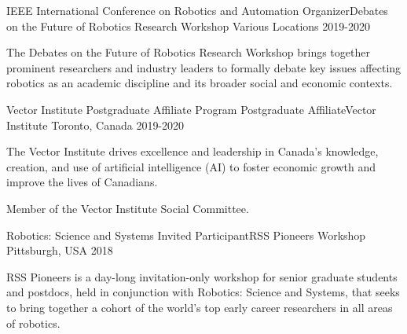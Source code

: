 

\begin{cventries} 

  \cventry
    {IEEE International Conference on Robotics and Automation} %
    {Organizer{\enskip\cdotp\enskip}Debates on the Future of Robotics Research Workshop} %
    {Various Locations} %
    {2019-2020} %
    {
      \begin{cvitems} %
        \item {The Debates on the Future of Robotics Research Workshop brings together prominent researchers and industry leaders to formally debate key issues affecting robotics as an academic discipline and its broader social and economic contexts.}
      \end{cvitems}
    }
    
  \cventry
    {Vector Institute Postgraduate Affiliate Program} %
    {Postgraduate Affiliate{\enskip\cdotp\enskip}Vector Institute} %
    {Toronto, Canada} %
    {2019-2020} %
    {
      \begin{cvitems} %
        \item {The Vector Institute drives excellence and leadership in Canada’s knowledge, creation, and use of artificial intelligence (AI) to foster economic growth and improve the lives of Canadians.}
        \item Member of the Vector Institute Social Committee.
      \end{cvitems}
    }
    
  \cventry
    {Robotics: Science and Systems} %
    {Invited Participant{\enskip\cdotp\enskip}RSS Pioneers Workshop} %
    {Pittsburgh, USA} %
    {2018} %
    {
      \begin{cvitems} %
        \item {RSS Pioneers is a day-long invitation-only workshop for senior graduate students and postdocs, held in conjunction with Robotics: Science and Systems, that seeks to bring together a cohort of the world’s top early career researchers in all areas of robotics.}
      \end{cvitems}
    }
    

\end{cventries}

